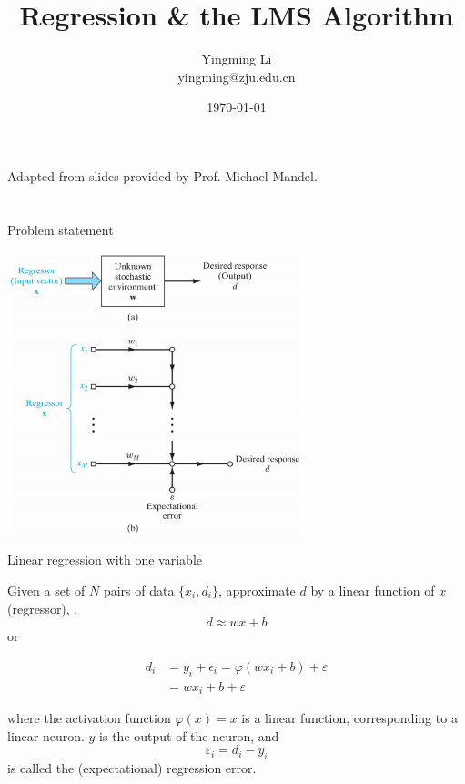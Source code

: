 \documentclass[notes]{beamer}
\title[Opt for ML]{Regression \& the LMS Algorithm}
\author[YingmingLi]{Yingming Li \\ yingming@zju.edu.cn}
\institute[DSERC, ZJU]{Data Science \& Engineering Research Center, ZJU}
\date[\today]{\today}
\begin{document}



\begin{frame}
	\titlepage
	\begin{center}
		Adapted from slides provided by Prof.  Michael Mandel.		
	\end{center}

\end{frame}

\section{}\label{section}

\begin{frame}{Problem statement}

\centering 

\includegraphics[width=0.65000\textwidth]{2018-03-09-15-26-11.png} ~

\end{frame}

\begin{frame}{Linear regression with one variable}

Given a set of \(N\) pairs of data \(\{x_i,d_i\}\), approximate \(d\) by
a linear function of \(x\) (regressor), \ie, \[d \approx wx +b\] or

\begin{equation*}
\begin{aligned}
d_i &= y_i + \epsilon_i  = \varphi (wx_i + b ) + \varepsilon \\ 
 & = wx_i + b+\varepsilon 
\end{aligned}
\end{equation*}

where the activation function \(\varphi(x) = x\) is a linear function,
corresponding to a linear neuron. \(y\) is the output of the neuron, and
\[\varepsilon_i = d_i -y_i\] is called the (expectational) regression
error.

\end{frame}
\end{document}
